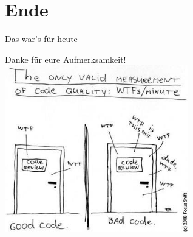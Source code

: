 \documentclass[18pt]{beamer}
\begin{document}
\section{Ende}
\begin{frame}[fragile]{Das war's für heute}
\begin{center}
Danke für eure Aufmerksamkeit!\newline
\includegraphics[width=0.6\textwidth]{wtf.png}
\end{center}
\end{frame}





\appendix
\beginbackup


\backupend
\end{document}
